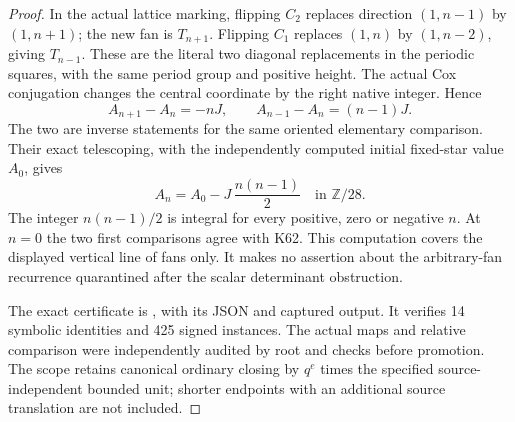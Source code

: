 \begin{proof}
In the actual lattice marking, flipping \(C_2\)
replaces direction \((1,n-1)\) by \((1,n+1)\);
the new fan is \(T_{n+1}\). Flipping \(C_1\)
replaces \((1,n)\) by \((1,n-2)\), giving
\(T_{n-1}\). These are the literal two diagonal
replacements in the periodic squares, with the
same period group and positive height.
The actual Cox conjugation changes the central
coordinate by the right native integer. Hence
\[
 A_{n+1}-A_n=-nJ,\qquad
 A_{n-1}-A_n=(n-1)J.                                \tag{SV.15}
\]
The two are inverse statements for the same
oriented elementary comparison. Their exact
telescoping, with the independently computed
initial fixed-star value \(A_0\), gives
\[
                   A_n=A_0-J\,\frac{n(n-1)}2
                          \quad\text{in }\mathbb Z/28.
                                                        \tag{SV.16}
\]
The integer \(n(n-1)/2\) is integral for every
positive, zero or negative \(n\). At \(n=0\)
the two first comparisons agree with K62.
This computation covers the displayed vertical
line of fans only. It makes no assertion about
the arbitrary-fan recurrence quarantined after
the scalar determinant obstruction.

The exact certificate is , with its
JSON and captured output. It verifies 14 symbolic identities and 425
signed instances. The actual maps and relative comparison were independently
audited by root and checks before promotion. The scope retains canonical
ordinary closing by \(q^e\) times the specified source-independent bounded unit;
shorter endpoints with an additional source translation are not included.
\end{proof}
